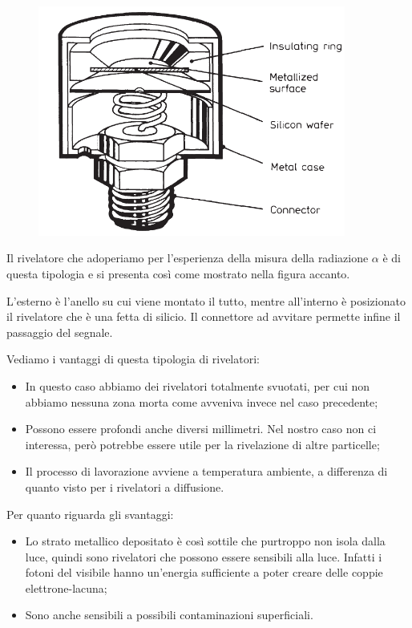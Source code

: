 \begin{minipage}{0.49\textwidth}
   \begin{figure}[H]
      \centering
      \includegraphics[width=0.9\textwidth]{immagini/schema_rivelatore_SSB.png}
   \end{figure}
\end{minipage}
\begin{minipage}{0.5\textwidth}
   \vspace{0.4cm}Il rivelatore che adoperiamo per l'esperienza della misura della radiazione $\alpha$ è di questa tipologia e si presenta così come mostrato nella figura accanto.
   
   L'esterno è l'anello su cui viene montato il tutto, mentre all'interno è posizionato il rivelatore che è una fetta di silicio. Il connettore ad avvitare permette infine il passaggio del segnale.
\end{minipage}

\vspace{0.3cm}Vediamo i vantaggi di questa tipologia di rivelatori:
\begin{itemize}[leftmargin=0.5cm]
   \item In questo caso abbiamo dei rivelatori totalmente svuotati, per cui non abbiamo nessuna zona morta come avveniva invece nel caso precedente;
   \item Possono essere profondi anche diversi millimetri. Nel nostro caso non ci interessa, però potrebbe essere utile per la rivelazione di altre particelle;
   \item Il processo di lavorazione avviene a temperatura ambiente, a differenza di quanto visto per i rivelatori a diffusione.
\end{itemize}
Per quanto riguarda gli svantaggi:
\begin{itemize}[leftmargin=0.5cm]
   \item Lo strato metallico depositato è così sottile che purtroppo non isola dalla luce, quindi sono rivelatori che possono essere sensibili alla luce. Infatti i fotoni del visibile hanno un'energia sufficiente a poter creare delle coppie elettrone-lacuna;
   \item Sono anche sensibili a possibili contaminazioni superficiali.
\end{itemize}

